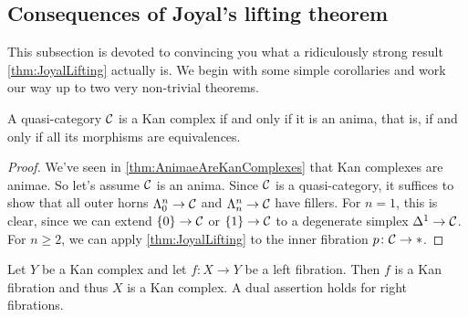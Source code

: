 \subsection{Consequences of Joyal's lifting theorem}
This subsection is devoted to convincing you what a ridiculously strong result \cref{thm:JoyalLifting} actually is. We begin with some simple corollaries and work our way up to two very non-trivial theorems.
\begin{cor}\label{cor:AnimaKanComplexes}
	A quasi-category $\mathcal{C}$ is a Kan complex if and only if it is an anima, that is, if and only if all its morphisms are equivalences.
\end{cor}
\begin{proof}
	We've seen in \cref{thm:AnimaeAreKanComplexes} that Kan complexes are animae. So let's assume $\mathcal{C}$ is an anima. Since $\mathcal{C}$ is a quasi-category, it suffices to show that all outer horns $\Lambda_0^n\rightarrow \mathcal{C}$ and $\Lambda_n^n\rightarrow \mathcal{C}$ have fillers. For $n=1$, this is clear, since we can extend $\{0\}\rightarrow \mathcal{C}$ or $\{1\}\rightarrow\mathcal{C}$ to a degenerate simplex $\Delta^1\rightarrow\mathcal{C}$. For $n\geqslant 2$, we can apply \cref{thm:JoyalLifting} to the inner fibration $p\colon \mathcal{C}\rightarrow *$.
\end{proof}
\begin{cor}\label{cor:LeftFibrationsOverAnima}
	Let $Y$ be a Kan complex and let $f\colon X\rightarrow Y$ be a left fibration. Then $f$ is a Kan fibration and thus $X$ is a Kan complex. A dual assertion holds for right fibrations.
\end{cor}
